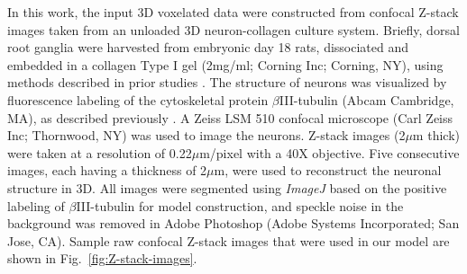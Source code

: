 \documentclass[]{interact}
\begin{document}
In this work, the input 3D voxelated data were constructed from confocal Z-stack images taken from an unloaded 3D neuron-collagen culture system. Briefly, dorsal root ganglia were harvested from embryonic day 18 rats, dissociated and embedded in a collagen Type I gel (2mg/ml; Corning Inc; Corning, NY), using methods described in prior studies \citep{Cullen:2012gu, Zhang:2016ga, Zhang:2017gr}. The structure of neurons was visualized by fluorescence labeling of the cytoskeletal protein $\beta$III-tubulin (Abcam Cambridge, MA), as described previously \citep{Zhang:2016ga, Zhang:2017gr}. A Zeiss LSM 510 confocal microscope (Carl Zeiss Inc; Thornwood, NY) was used to image the neurons.  Z-stack images (2$\mu$m thick) were taken at a resolution of 0.22$\mu$m/pixel with a 40X objective. Five consecutive images, each having a thickness of 2$\mu$m, were used to reconstruct the neuronal structure in 3D. All images were segmented using \textit{ImageJ} \citep{Schneider:2012dw} based on the positive labeling of $\beta$III-tubulin for model construction, and speckle noise in the background was removed in Adobe Photoshop (Adobe Systems Incorporated; San Jose, CA). Sample raw confocal Z-stack images that were used in our model are shown in Fig.\ \ref{fig:Z-stack-images}. 
%
\end{document}
